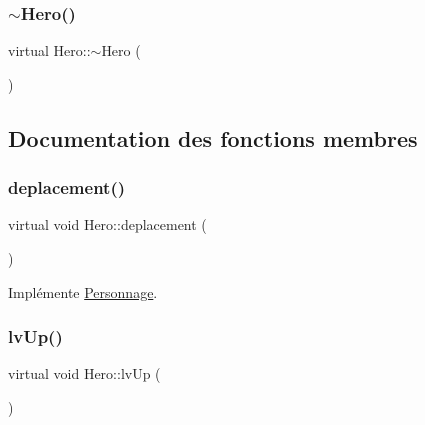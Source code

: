 \mbox{\label{classHero_afe27b3ed103640330e911197d95d7c18}} 
\subsubsection{\texorpdfstring{$\sim$\+Hero()}{~Hero()}}
{\footnotesize\ttfamily virtual Hero\+::$\sim$\+Hero (\begin{DoxyParamCaption}{ }\end{DoxyParamCaption})\hspace{0.3cm}{\ttfamily [virtual]}}



\subsection{Documentation des fonctions membres}
\mbox{\label{classHero_a0429397b47b0d3969c4e30cc5bdee250}} 
\subsubsection{\texorpdfstring{deplacement()}{deplacement()}}
{\footnotesize\ttfamily virtual void Hero\+::deplacement (\begin{DoxyParamCaption}{ }\end{DoxyParamCaption})\hspace{0.3cm}{\ttfamily [virtual]}}



Implémente \hyperlink{classPersonnage_afb4a375fa5494eb586b9470d72a46694}{Personnage}.

\mbox{\label{classHero_af49c7f895ca52c04d8a9c7bd7fae96b5}} 
\subsubsection{\texorpdfstring{lv\+Up()}{lvUp()}}
{\footnotesize\ttfamily virtual void Hero\+::lv\+Up (\begin{DoxyParamCaption}{ }\end{DoxyParamCaption})\hspace{0.3cm}{\ttfamily [virtual]}}



